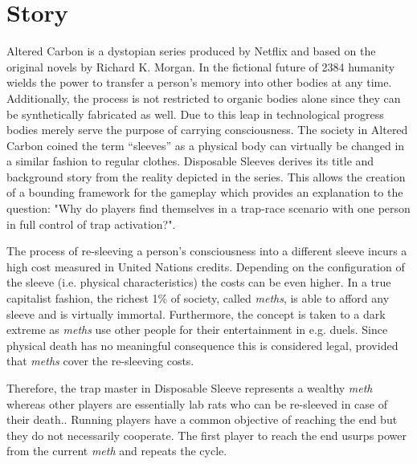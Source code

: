 \section{Story} \label{sec:story}

Altered Carbon is a dystopian series produced by Netflix and based on the original novels by Richard K. Morgan.
In the fictional future of 2384 humanity wields the power to transfer a person's memory into other bodies at any time.
Additionally, the process is not restricted to organic bodies alone since they can be synthetically fabricated as well.
Due to this leap in technological progress bodies merely serve the purpose of carrying consciousness.
The society in Altered Carbon coined the term ``sleeves'' as a physical body can virtually be changed in a similar fashion to regular clothes.
Disposable Sleeves derives its title and background story from the reality depicted in the series.
This allows the creation of a bounding framework for the gameplay which provides an explanation to the question: "Why do players find themselves in a trap-race scenario with one person in full control of trap activation?".

The process of re-sleeving a person's consciousness into a different sleeve incurs a high cost measured in United Nations credits.
Depending on the configuration of the sleeve (i.e. physical characteristics) the costs can be even higher.
In a true capitalist fashion, the richest 1\% of society, called \emph{meths}, is able to afford any sleeve and is virtually immortal.
Furthermore, the concept is taken to a dark extreme as \emph{meths} use other people for their entertainment in e.g. duels.
Since physical death has no meaningful consequence this is considered legal, provided that \emph{meths} cover the re-sleeving costs.

Therefore, the trap master in Disposable Sleeve represents a wealthy \emph{meth} whereas other players are essentially lab rats who can be re-sleeved in case of their death..
Running players have a common objective of reaching the end but they do not necessarily cooperate.
The first player to reach the end usurps power from the current \emph{meth} and repeats the cycle.